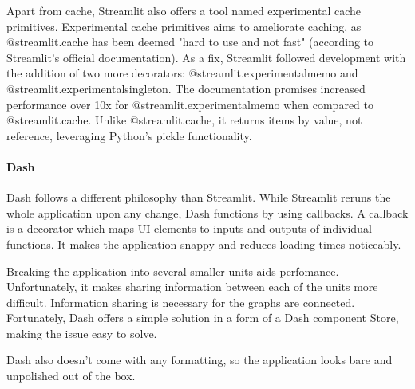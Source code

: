 Apart from cache, Streamlit also offers a tool named experimental cache primitives. Experimental cache primitives aims to ameliorate caching, as @streamlit.cache has been deemed "hard to use and not fast" (according to Streamlit's official documentation). As a fix, Streamlit followed development with the addition of two more decorators: @streamlit.experimental\textunderscore memo and @streamlit.experimental\textunderscore singleton. The documentation promises increased performance over 10x for @streamlit.experimental\textunderscore memo when compared to @streamlit.cache. Unlike @streamlit.cache, it returns items by value, not reference, leveraging Python's pickle functionality. 

\paragraph{Dash}
\label{sec:dash3}
Dash follows a different philosophy than Streamlit. While Streamlit reruns the whole application upon any change, Dash functions by using callbacks. A callback is a decorator which maps UI elements to inputs and outputs of individual functions. It makes the application snappy and reduces loading times noticeably. 

Breaking the application into several smaller units aids perfomance. Unfortunately, it makes sharing information between each of the units more difficult. Information sharing is necessary for the graphs are connected. Fortunately, Dash offers a simple solution in a form of a Dash component Store, making the issue easy to solve. 

Dash also doesn't come with any formatting, so the application looks bare and unpolished out of the box.